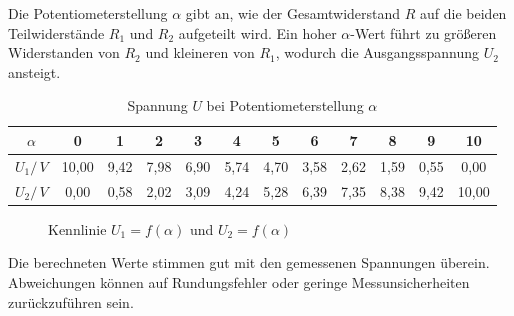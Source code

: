 Die Potentiometerstellung $\alpha$ gibt an, wie der Gesamtwiderstand $R$ auf die beiden Teilwiderstände $R_1$ und $R_2$ aufgeteilt wird. Ein hoher $\alpha$-Wert führt zu größeren Widerstanden von $R_2$ und kleineren von $R_1$, wodurch die Ausgangsspannung $U_2$ ansteigt.

\begin{table}[H]
\centering
\caption{Spannung $U$ bei Potentiometerstellung $\alpha$}
\begin{tabular}{ c c c c c c c c c c c c} %
\toprule
    $\alpha$ & 0 & 1 & 2 & 3 & 4 & 5 & 6 & 7 & 8 & 9 & 10 \\
     \midrule
    $U_1/\,\unit{V}$ & 10,00 & 9,42 & 7,98 & 6,90 & 5,74 & 4,70 & 3,58 & 2,62 & 1,59 & 0,55 & 0,00 \\
    $U_2/\,\unit{V}$ & 0,00 & 0,58 & 2,02 & 3,09 & 4,24 & 5,28 & 6,39 & 7,35 & 8,38 & 9,42 & 10,00 \\
    \bottomrule
\end{tabular}
\label{tab:K4T1}%
\end{table}
\vspace{0.5cm}
\begin{figure}[H]
\centering
{}
\caption{Kennlinie $U_1 =f(\alpha)$ und $U_2 =f(\alpha)$}
\label{fig:K4A2}
\end{figure}

Die berechneten Werte stimmen gut mit den gemessenen Spannungen überein. Abweichungen können auf Rundungsfehler oder geringe Messunsicherheiten zurückzuführen sein.

